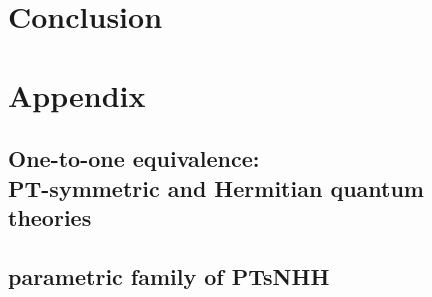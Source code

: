 \documentclass[12pt, a4paper]{report}
\newenvironment{Figure}
    {\par\medskip\noindent\minipage{\linewidth}}
    {\endminipage\par\medskip}
\newcommand\PT{\(\mathcal{PT}\)}
\begin{document}









\chapter{Conclusion}\label{Conclusion}





%


\chapter{Appendix}\label{appendix}

\section*{One-to-one equivalence:\\ PT-symmetric and Hermitian quantum theories}



\section*{parametric family of PTsNHH}
\end{document}
